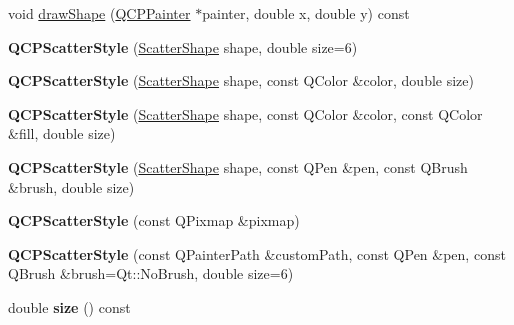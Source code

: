 \begin{DoxyCompactItemize}
\item 
void \hyperlink{class_q_c_p_scatter_style_a95c297b114c77c22428ef40f54620ddf}{draw\+Shape} (\hyperlink{class_q_c_p_painter}{Q\+C\+P\+Painter} $\ast$painter, double x, double y) const
\item 
\mbox{\label{class_q_c_p_scatter_style_a003d92f74f4561eda111862eadd62f28}} 
{\bfseries Q\+C\+P\+Scatter\+Style} (\hyperlink{class_q_c_p_scatter_style_adb31525af6b680e6f1b7472e43859349}{Scatter\+Shape} shape, double size=6)
\item 
\mbox{\label{class_q_c_p_scatter_style_afa059da858c864c7e05871dc602d7eab}} 
{\bfseries Q\+C\+P\+Scatter\+Style} (\hyperlink{class_q_c_p_scatter_style_adb31525af6b680e6f1b7472e43859349}{Scatter\+Shape} shape, const Q\+Color \&color, double size)
\item 
\mbox{\label{class_q_c_p_scatter_style_a6e1b64f12cac7f07af180ae4316fd38d}} 
{\bfseries Q\+C\+P\+Scatter\+Style} (\hyperlink{class_q_c_p_scatter_style_adb31525af6b680e6f1b7472e43859349}{Scatter\+Shape} shape, const Q\+Color \&color, const Q\+Color \&fill, double size)
\item 
\mbox{\label{class_q_c_p_scatter_style_a85acc4941d7e5c9bca5fa51377a77f49}} 
{\bfseries Q\+C\+P\+Scatter\+Style} (\hyperlink{class_q_c_p_scatter_style_adb31525af6b680e6f1b7472e43859349}{Scatter\+Shape} shape, const Q\+Pen \&pen, const Q\+Brush \&brush, double size)
\item 
\mbox{\label{class_q_c_p_scatter_style_a63962094587a4c2258435aa7933996cc}} 
{\bfseries Q\+C\+P\+Scatter\+Style} (const Q\+Pixmap \&pixmap)
\item 
\mbox{\label{class_q_c_p_scatter_style_a879c30647683b3cfbde2afecea815e6f}} 
{\bfseries Q\+C\+P\+Scatter\+Style} (const Q\+Painter\+Path \&custom\+Path, const Q\+Pen \&pen, const Q\+Brush \&brush=Qt\+::\+No\+Brush, double size=6)
\item 
\mbox{\label{class_q_c_p_scatter_style_a0e94526d9165d9f50e262102bdd71a47}} 
double {\bfseries size} () const
\item 
\mbox{\label{class_q_c_p_scatter_style_af04cad55bd7f58a96da4fc6bc46a0a1e}} 

\end{DoxyCompactItemize}
